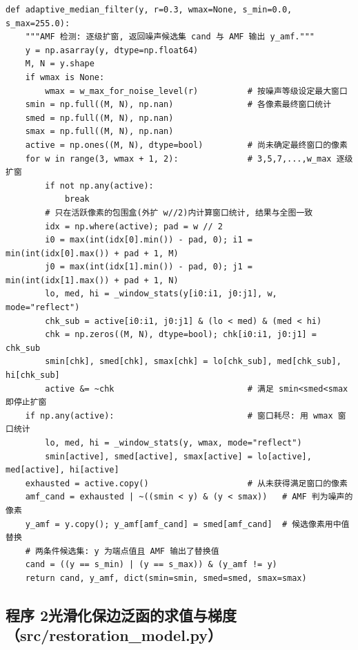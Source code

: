 \documentclass[withoutpreface,bwprint]{cumcmthesis}
\begin{document}
\begin{lstlisting}[style=appcode]
def adaptive_median_filter(y, r=0.3, wmax=None, s_min=0.0, s_max=255.0):
    """AMF 检测: 逐级扩窗, 返回噪声候选集 cand 与 AMF 输出 y_amf."""
    y = np.asarray(y, dtype=np.float64)
    M, N = y.shape
    if wmax is None:
        wmax = w_max_for_noise_level(r)          # 按噪声等级设定最大窗口
    smin = np.full((M, N), np.nan)               # 各像素最终窗口统计
    smed = np.full((M, N), np.nan)
    smax = np.full((M, N), np.nan)
    active = np.ones((M, N), dtype=bool)         # 尚未确定最终窗口的像素
    for w in range(3, wmax + 1, 2):              # 3,5,7,...,w_max 逐级扩窗
        if not np.any(active):
            break
        # 只在活跃像素的包围盒(外扩 w//2)内计算窗口统计, 结果与全图一致
        idx = np.where(active); pad = w // 2
        i0 = max(int(idx[0].min()) - pad, 0); i1 = min(int(idx[0].max()) + pad + 1, M)
        j0 = max(int(idx[1].min()) - pad, 0); j1 = min(int(idx[1].max()) + pad + 1, N)
        lo, med, hi = _window_stats(y[i0:i1, j0:j1], w, mode="reflect")
        chk_sub = active[i0:i1, j0:j1] & (lo < med) & (med < hi)
        chk = np.zeros((M, N), dtype=bool); chk[i0:i1, j0:j1] = chk_sub
        smin[chk], smed[chk], smax[chk] = lo[chk_sub], med[chk_sub], hi[chk_sub]
        active &= ~chk                           # 满足 smin<smed<smax 即停止扩窗
    if np.any(active):                           # 窗口耗尽: 用 wmax 窗口统计
        lo, med, hi = _window_stats(y, wmax, mode="reflect")
        smin[active], smed[active], smax[active] = lo[active], med[active], hi[active]
    exhausted = active.copy()                    # 从未获得满足窗口的像素
    amf_cand = exhausted | ~((smin < y) & (y < smax))   # AMF 判为噪声的像素
    y_amf = y.copy(); y_amf[amf_cand] = smed[amf_cand]  # 候选像素用中值替换
    # 两条件候选集: y 为端点值且 AMF 输出了替换值
    cand = ((y == s_min) | (y == s_max)) & (y_amf != y)
    return cand, y_amf, dict(smin=smin, smed=smed, smax=smax)
\end{lstlisting}

\subsection*{程序 2\quad 光滑化保边泛函的求值与梯度（src/restoration\_model.py）}
\end{document}
